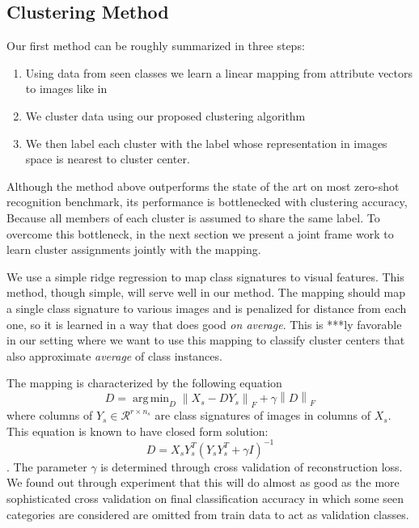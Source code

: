 \documentclass[wcp]{jmlr}
\newcommand{\norm}[1]{\left \lVert #1 \right \rVert_{F}}
\DeclareMathOperator*{\argmin}{arg\,min}
\begin{document}
\subsection{Clustering Method}
Our first method can be roughly summarized in three steps:
\begin{enumerate}
  \item Using data from seen classes we learn a linear mapping from  attribute vectors to images like in \cite{Kodirov2015}
  \item We cluster data using our proposed clustering algorithm
  \item We then label each cluster with the label whose representation in images space is nearest to cluster center.
\end{enumerate}
 Although the method above outperforms the state of the art on most zero-shot recognition benchmark,
its performance is bottlenecked with clustering accuracy, Because all members of each cluster is assumed to
share the same label. To overcome this bottleneck, in the next section we
present a joint frame work to learn cluster assignments jointly with the mapping.

We use a simple ridge regression to map class signatures to visual features. This method, though simple,
will serve well in our method. The mapping should map a single class signature to various images and is penalized
for distance from each one, so it is learned in a way that does good \textit{on average}. This is ***ly
favorable in our setting where we want to use this mapping to classify cluster centers that also
approximate \textit{average} of class instances.

The mapping is characterized by the following equation
\begin{equation}
  D = \argmin_D \norm{X_s - D Y_s} + \gamma \norm{D}
\end{equation}
where columns of $ Y_s \in \mathcal{R}^{r \times n_s} $  are class signatures of images in columns of $X_s$.
This equation is known to have closed form solution:
\begin{equation} \label{eq:dic}
  D = X_s Y_s^T (Y_s Y_s^T + \gamma I)^{-1}
\end{equation}.
The parameter $\gamma$ is determined through cross validation of reconstruction loss. We found out through experiment that
this will do almost as good as the more sophisticated
 cross validation on final classification accuracy in which some seen categories are considered are omitted
 from train data to act as validation classes.
\end{document}
